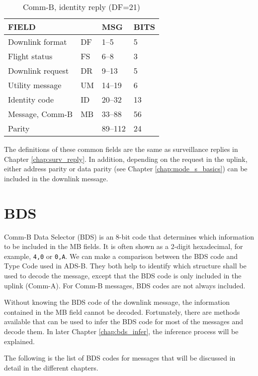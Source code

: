 \begin{table}[ht]
  \centering
  \caption{Comm-B, identity reply (DF=21)}
  \label{tb:df_21_structure}
  \begin{tabular}[t]{|l|l|l|l|}
  \hline
  \textbf{FIELD} & \textbf{} & \textbf{MSG} & \textbf{BITS} \\ \hline
  Downlink format         & DF & 1--5    & 5   \\ \hline
  Flight status           & FS & 6--8    & 3   \\ \hline
  Downlink request        & DR & 9--13   & 5   \\ \hline
  Utility message         & UM & 14--19  & 6   \\ \hline
  Identity code           & ID & 20--32  & 13  \\ \hline
  Message, Comm-B         & MB & 33--88  & 56  \\ \hline
  Parity  &  & 89--112  & 24  \\ \hline
  \end{tabular}
\end{table}

The definitions of these common fields are the same as surveillance replies in Chapter \ref{chap:surv_reply}. In addition, depending on the request in the uplink, either address parity or data parity (see Chapter \ref{chap:mode_s_basics}) can be included in the downlink message.


\section{BDS}

Comm-B Data Selector (BDS) is an 8-bit code that determines which information to be included in the MB fields. It is often shown as a 2-digit hexadecimal, for example, \texttt{4,0} or \texttt{0,A}. We can make a comparison between the BDS code and Type Code used in ADS-B. They both help to identify which structure shall be used to decode the message, except that the BDS code is only included in the uplink (Comm-A). For Comm-B messages, BDS codes are not always included.

Without knowing the BDS code of the downlink message, the information contained in the MB field cannot be decoded. Fortunately, there are methods available that can be used to infer the BDS code for most of the messages and decode them. In later Chapter \ref{chap:bds_infer}, the inference process will be explained.

The following is the list of BDS codes for messages that will be discussed in detail in the different chapters.

